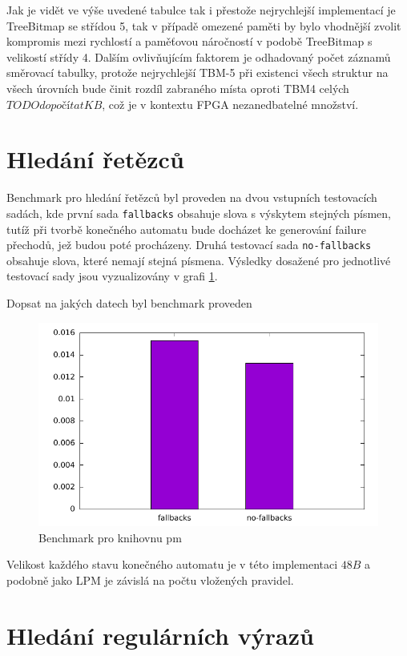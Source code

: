Jak je vidět ve výše uvedené tabulce tak i přestože nejrychlejší implementací je TreeBitmap se střídou 5,
tak v případě omezené paměti by bylo vhodnější zvolit kompromis mezi rychlostí a paměťovou náročností v podobě
TreeBitmap s velikostí střídy 4. Dalším ovlivňujícím faktorem je odhadovaný počet záznamů směrovací tabulky, protože
nejrychlejší TBM-5 při existenci všech struktur na všech úrovních bude činit rozdíl zabraného místa oproti TBM4
celých $TODO dopočítat KB$, což je v kontextu FPGA nezanedbatelné množství.

\section{Hledání řetězců} %
Benchmark pro hledání řetězců byl proveden na dvou vstupních testovacích sadách,
kde první sada \texttt{fallbacks} obsahuje slova s výskytem stejných písmen, tutíž při tvorbě konečného automatu bude
docházet ke generování failure přechodů, jež budou poté procházeny. Druhá testovací sada \texttt{no-fallbacks}
obsahuje slova, které nemají stejná písmena. Výsledky dosažené pro jednotlivé testovací sady jsou
vyzualizovány v grafi \ref{fig:pm}.

Dopsat na jakých datech byl benchmark proveden
\begin{figure}[!htbp]
	\centering
	\includegraphics[scale=0.7]{fig/pm.pdf}
	\caption{Benchmark pro knihovnu pm}
    \label{fig:pm}
\end{figure}

Velikost každého stavu konečného automatu je v této implementaci $48B$
a podobně jako LPM je závislá na počtu vložených pravidel.

\section{Hledání regulárních výrazů} %

